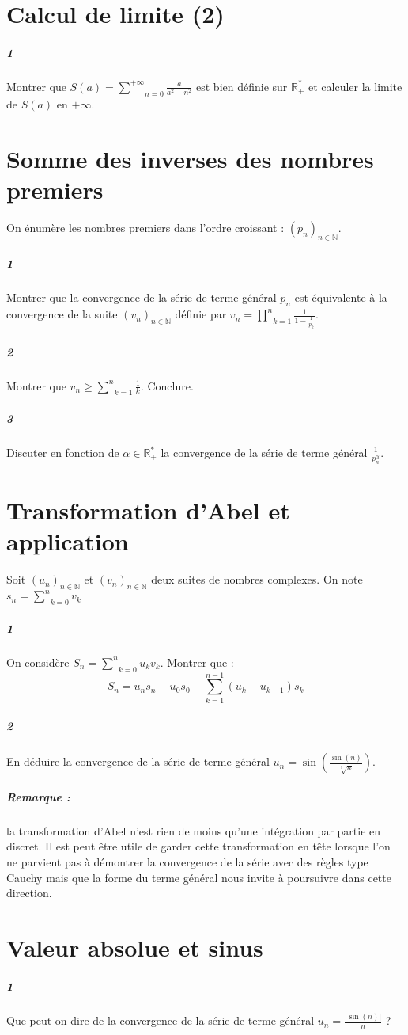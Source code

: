 \documentclass[10pt,a4paper]{article}
\begin{document}
\section{Calcul de limite (2)}
\subparagraph{1}Montrer que $S(a)=\underset{n=0}{\overset{+\infty}{\sum}} \frac{a}{a^2+n^2}$ est bien définie sur $\mathbb{R}_+^*$ et calculer la limite de $S(a)$ en $+\infty$.

\section{Somme des inverses des nombres premiers}
On énumère les nombres premiers dans l'ordre croissant : $(p_n)_{n \in \mathbb{N}}$.
\subparagraph{1}Montrer que la convergence de la série de terme général $p_n$ est équivalente à la convergence de la suite $(v_n)_{n \in \mathbb{N}}$ définie par $v_n = \underset{k=1}{\overset{n}{\prod}}\frac{1}{1- \frac{1}{p_k}}$.
\subparagraph{2}Montrer que $v_n \ge \underset{k=1}{\overset{n}{\sum}} \frac{1}{k}$. Conclure.
\subparagraph{3}Discuter en fonction de $\alpha \in \mathbb{R}_+^*$ la convergence de la série de terme général $\frac{1}{p_n^{\alpha}}$.

\section{Transformation d'Abel et application}
Soit $(u_n)_{n \in \mathbb{N}}$ et $(v_n)_{n \in \mathbb{N}}$ deux suites de nombres complexes. On note $s_n = \underset{k=0}{\overset{n}{\sum}}v_k$
\subparagraph{1}On considère $S_n = \underset{k=0}{\overset{n}{\sum}}u_k v_k$. Montrer que :
\begin{equation*}
S_n = u_n s_n - u_0s_0 - \underset{k=1}{\overset{n-1}{\sum}}(u_{k}-u_{k-1}) s_k
\end{equation*}
\subparagraph{2}En déduire la convergence de la série de terme général $u_n = \sin \left( \frac{\sin(n)}{\sqrt[3]{n}} \right)$.
\subparagraph{Remarque :} la transformation d'Abel n'est rien de moins qu'une intégration par partie en discret. Il est peut être utile de garder cette transformation en tête lorsque l'on ne parvient pas à démontrer la convergence de la série avec des règles type Cauchy mais que la forme du terme général nous invite à poursuivre dans cette direction.

\section{Valeur absolue et sinus}
\subparagraph{1}Que peut-on dire de la convergence de la série de terme général $u_n = \frac{\vert \sin(n) \vert}{n}$ ?
\end{document}
